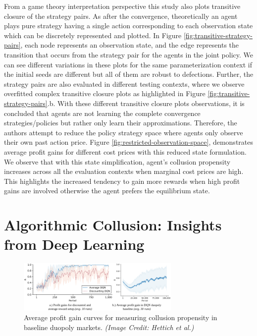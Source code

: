 \documentclass{article}
\begin{document}
From a game theory interpretation perspective this study also plots transitive closure of the strategy pairs. 
As after the convergence, theoretically an agent plays pure strategy having a single action corresponding to each observation state which can be discretely represented and plotted.
In Figure \ref{fig:transitive-strategy-pairs}, each node represents an observation state, and the edge represents the transition that occurs from the strategy pair for the agents in the joint policy.
We can see different variations in these plots for the same parameterization context if the initial seeds are different but all of them are robust to defections.
Further, the strategy pairs are also evaluated in different testing contexts, where we observe overfitted complex transitive closure plots as highlighted in Figure \ref{fig:transitive-strategy-pairs}.b.
With these different transitive closure plots observations, it is concluded that agents are not learning the complete convergence strategies/policies but rather only learn their approximations.
Therefore, the authors attempt to reduce the policy strategy space where agents only observe their own past action price.
Figure \ref{fig:restricted-observation-space}, demonstrates average profit gains for different cost prices with this reduced state formulation.
We observe that with this state simplification, agent’s collusion propensity increases across all the evaluation contexts when marginal cost prices are high.
This highlights the increased tendency to gain more rewards when high profit gains are involved otherwise the agent prefers the equilibrium state.


\section{Algorithmic Collusion: Insights from Deep Learning}


\begin{figure}[h]
    \centering
    \includegraphics[width=0.7\textwidth]{study-two/learning-curves-merged.png}
    \caption{Average profit gain curves for measuring collusion propensity in baseline duopoly markets. \textit{(Image Credit: Hettich et al.)}}
    \label{fig:learning-curves-merged}
\end{figure}
\end{document}
